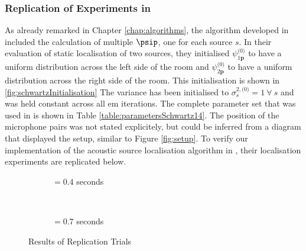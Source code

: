 \subsubsection{Replication of Experiments in \citeauthor{Schwartz2014} \citeyearpar{Schwartz2014}}
As already remarked in Chapter \ref{chap:algorithms}, the algorithm developed in \cite{Schwartz2014} included the calculation of multiple $\psip$, one for each source $s$. In their evaluation of static localisation of two sources, they initialised $\psi^{\text{(0)}}_{1\bm p} $ to have a uniform distribution across the left side of the room and $\psi^{\text{(0)}}_{2\bm p} $ to have a uniform distribution across the right side of the room. This initialisation is shown in \autoref{fig:schwartzInitialisation} The variance has been initialised to $\sigma^{2, \text{(0)}}_s=1\ \forall\ s$ and was held constant across all \gls{em} iterations. The complete parameter set that was used in \cite{Schwartz2014} is shown in Table \ref{table:parametersSchwartz14}. The position of the microphone pairs was not stated explicitely, but could be inferred from a diagram that displayed the setup, similar to Figure \ref{fig:setup}. To verify our implementation of the acoustic source localisation algorithm in \cite{Schwartz2014}, their localisation experiments are replicated below.



\newpage
\begin{figure}[!p]
	\begin{subfigure}{\textwidth}
		\iftoggle{quick}{%
			\texttt{[image: plots/schwartz2014/s=2-sloc=schwartz2014-T60=0.4-prior=schwartz2014-results-sc]}
		}{%
			\setlength{\figurewidth}{\textwidth}
			
		}
		\caption{\Tsixty$=0.4$ seconds}
	\end{subfigure}\\[24pt]
	\begin{subfigure}{\textwidth}
		\iftoggle{quick}{%
			\texttt{[image: plots/schwartz2014/s=2-sloc=schwartz2014-T60=0.7-prior=schwartz2014-results-sc]}
		}{%
			\setlength{\figurewidth}{\textwidth}
			
		}
		\caption{\Tsixty$=0.7$ seconds}
	\end{subfigure}
	\caption{Results of Replication Trials}
	\label{fig:resultsReplication}
\end{figure}

